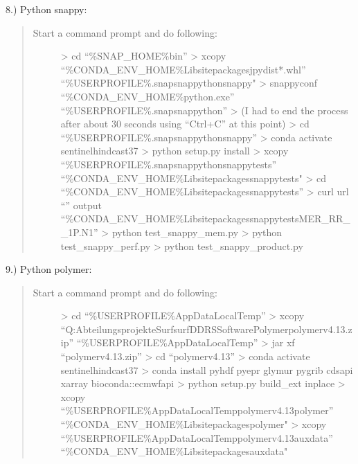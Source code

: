 \documentclass[letterpaper,10pt,english]{sphinxmanual}
\begin{document}
8.) Python \sphinxhyphen{} snappy: 
\begin{quote}
\begin{description}
\item[{Start a command prompt and do following:}] \leavevmode
\textgreater{} cd “\%SNAP\_HOME\%bin”
\textgreater{} xcopy “\%CONDA\_ENV\_HOME\%Libsite\sphinxhyphen{}packagesjpydist*.whl” “\%USERPROFILE\%.snapsnap\sphinxhyphen{}pythonsnappy"
\textgreater{} snappy\sphinxhyphen{}conf “\%CONDA\_ENV\_HOME\%python.exe” “\%USERPROFILE\%.snapsnap\sphinxhyphen{}python”
\textgreater{} (I had to end the process after about 30 seconds using “Ctrl+C” at this point)
\textgreater{} cd “\%USERPROFILE\%.snapsnap\sphinxhyphen{}pythonsnappy”
\textgreater{} conda activate sentinel\sphinxhyphen{}hindcast\sphinxhyphen{}37
\textgreater{} python setup.py install
\textgreater{} xcopy “\%USERPROFILE\%.snapsnap\sphinxhyphen{}pythonsnappytests” “\%CONDA\_ENV\_HOME\%Libsite\sphinxhyphen{}packagessnappytests"
\textgreater{} cd “\%CONDA\_ENV\_HOME\%Libsite\sphinxhyphen{}packagessnappytests”
\textgreater{} curl \textendash{}url “” \textendash{}output “\%CONDA\_ENV\_HOME\%Libsite\sphinxhyphen{}packagessnappytestsMER\_RR\_\_1P.N1”
\textgreater{} python test\_snappy\_mem.py
\textgreater{} python test\_snappy\_perf.py
\textgreater{} python test\_snappy\_product.py

\end{description}
\end{quote}

9.) Python \sphinxhyphen{} polymer: 
\begin{quote}
\begin{description}
\item[{Start a command prompt and do following:}] \leavevmode
\textgreater{} cd “\%USERPROFILE\%AppDataLocalTemp”
\textgreater{} xcopy “Q:AbteilungsprojekteSurfsurf\sphinxhyphen{}DDRSSoftwarePolymerpolymer\sphinxhyphen{}v4.13.zip” “\%USERPROFILE\%AppDataLocalTemp”
\textgreater{} jar xf “polymer\sphinxhyphen{}v4.13.zip”
\textgreater{} cd “polymer\sphinxhyphen{}v4.13”
\textgreater{} conda activate sentinel\sphinxhyphen{}hindcast\sphinxhyphen{}37
\textgreater{} conda install pyhdf pyepr glymur pygrib cdsapi xarray bioconda::ecmwfapi
\textgreater{} python setup.py build\_ext \textendash{}inplace
\textgreater{} xcopy “\%USERPROFILE\%AppDataLocalTemppolymer\sphinxhyphen{}v4.13polymer” “\%CONDA\_ENV\_HOME\%Libsite\sphinxhyphen{}packagespolymer"
\textgreater{} xcopy “\%USERPROFILE\%AppDataLocalTemppolymer\sphinxhyphen{}v4.13auxdata” “\%CONDA\_ENV\_HOME\%Libsite\sphinxhyphen{}packagesauxdata"

\end{description}
\end{quote}
\end{document}
